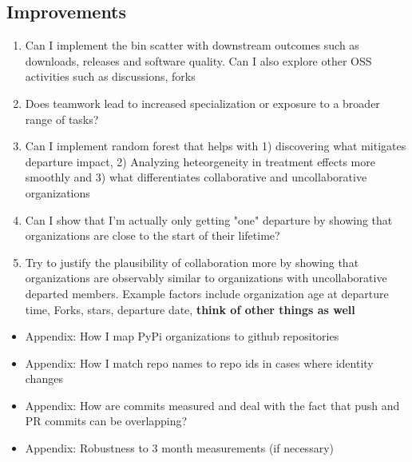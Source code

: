 \documentclass[12pt,notitlepage]{article}
\begin{document}
\subsection{Improvements}
\begin{enumerate}
\item Can I implement the bin scatter with downstream outcomes such as downloads, releases and software quality. Can I also explore other OSS activities such as discussions, forks
\item Does teamwork lead to increased specialization or exposure to a broader range of tasks?
\item Can I implement random forest that helps with 1) discovering what mitigates departure impact, 2) Analyzing heteorgeneity in treatment effects more smoothly and 3) what differentiates collaborative and uncollaborative organizations
\item Can I show that I'm actually only getting "one" departure by showing that organizations are close to the start of their lifetime? 
\item Try to justify the plausibility of collaboration more by showing that organizations are observably similar to organizations with uncollaborative departed members. Example factors include organization age at departure time, Forks, stars, departure date, \textbf{think of other things as well}
\end{enumerate}


\begin{itemize}
\item Appendix: How I map PyPi organizations to github repositories
\item Appendix: How I match repo names to repo ids in cases where identity changes
\item Appendix: How are commits measured and deal with the fact that push and PR commits can be overlapping? 
\item Appendix: Robustness to 3 month measurements (if necessary)
\end{itemize}
\end{document}
